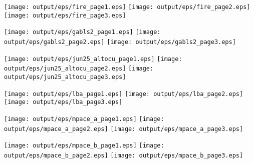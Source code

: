 \documentclass[11pt]{article}
\begin{document}
\begin{center}

\texttt{[image: output/eps/fire\_page1.eps]}
\texttt{[image: output/eps/fire\_page2.eps]}
\texttt{[image: output/eps/fire\_page3.eps]}
\end{center}
\newpage

\begin{center}

\texttt{[image: output/eps/gabls2\_page1.eps]}
\texttt{[image: output/eps/gabls2\_page2.eps]}
\texttt{[image: output/eps/gabls2\_page3.eps]}
\end{center}
\newpage

\begin{center}

\texttt{[image: output/eps/jun25\_altocu\_page1.eps]}
\texttt{[image: output/eps/jun25\_altocu\_page2.eps]}
\texttt{[image: output/eps/jun25\_altocu\_page3.eps]}
\end{center}
\newpage

\begin{center}

\texttt{[image: output/eps/lba\_page1.eps]}
\texttt{[image: output/eps/lba\_page2.eps]}
\texttt{[image: output/eps/lba\_page3.eps]}
\end{center}
\newpage

\begin{center}

\texttt{[image: output/eps/mpace\_a\_page1.eps]}
\texttt{[image: output/eps/mpace\_a\_page2.eps]}
\texttt{[image: output/eps/mpace\_a\_page3.eps]}
\end{center}
\newpage

\begin{center}

\texttt{[image: output/eps/mpace\_b\_page1.eps]}
\texttt{[image: output/eps/mpace\_b\_page2.eps]}
\texttt{[image: output/eps/mpace\_b\_page3.eps]}
\end{center}
\newpage
\end{document}
